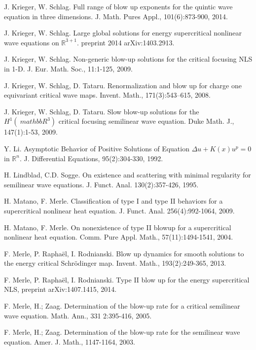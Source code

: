 \documentclass[11pt,a4paper,reqno]{amsart}
\theoremstyle{remark}
\numberwithin{equation}{section}
\begin{document}
\begin{thebibliography}{99}
 J. Krieger, W. Schlag. Full range of blow up exponents for the quintic wave equation in three dimensions. J. Math. Pures Appl., 101(6):873-900, 2014.

 J. Krieger, W. Schlag. Large global solutions for energy supercritical nonlinear wave equations on $\mathbb R ^{3+ 1}$. preprint 2014 arXiv:1403.2913.

 J. Krieger, W. Schlag. Non-generic blow-up solutions for the critical focusing NLS in 1-D. J. Eur. Math. Soc., 11:1-125, 2009.

 J. Krieger, W. Schlag, D. Tataru. Renormalization and blow up for charge one equivariant critical wave maps. Invent. Math., 171(3):543--615, 2008.

 J. Krieger, W. Schlag, D. Tataru. Slow blow-up solutions for the $ H^ 1 ({\ mathbb R}^ 3) $ critical focusing semilinear wave equation. Duke Math. J., 147(1):1-53, 2009.

 Y. Li. Asymptotic Behavior of Positive Solutions of Equation $\Delta u +K(x)u^p=0$ in $\mathbb{R}^n$. J. Differential Equations, 95(2):304-330, 1992.
  
 H. Lindblad, C.D. Sogge. On existence and scattering with minimal regularity for semilinear wave equations. J. Funct. Anal. 130(2):357-426, 1995.
   
  H. Matano, F. Merle. Classification of type I and type II behaviors for a supercritical nonlinear heat equation. J. Funct. Anal. 256(4):992-1064, 2009.

  H. Matano, F. Merle. On nonexistence of type II blowup for a supercritical nonlinear heat equation. Comm. Pure Appl. Math., 57(11):1494-1541, 2004.

 F. Merle, P. Rapha\"el, I. Rodnianski. Blow up dynamics for smooth solutions to the energy critical Schr\"odinger map. Invent. Math., 193(2):249-365, 2013.

 F. Merle, P. Rapha\"el, I. Rodnianski. Type II blow up for the energy supercritical NLS, preprint arXiv:1407.1415, 2014.

  F. Merle, H.; Zaag. Determination of the blow-up rate for a critical semilinear wave equation. Math. Ann., 331 2:395-416, 2005.

  F. Merle, H.; Zaag. Determination of the blow-up rate for the semilinear wave equation. Amer. J. Math., 1147-1164, 2003.


\end{thebibliography}
\end{document}
